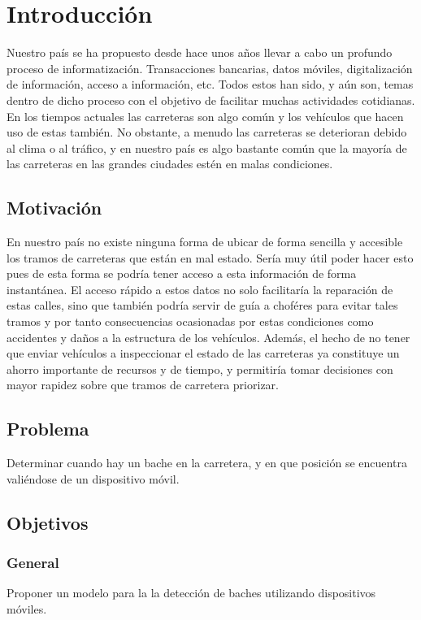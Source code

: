 \chapter*{Introducción}\label{chapter:introduction}

Nuestro país se ha propuesto desde hace unos años llevar a cabo un profundo proceso de informatización.
Transacciones bancarias, datos móviles, digitalización de información, acceso a información, etc. Todos
estos han sido, y aún son, temas dentro de dicho proceso con el objetivo de facilitar muchas actividades
cotidianas. En los tiempos actuales las carreteras son algo común y los vehículos que hacen uso de estas
también. No obstante, a menudo las carreteras se deterioran debido al clima o al tráfico, y en nuestro
país es algo bastante común que la mayoría de las carreteras en las grandes ciudades estén en malas condiciones.

\section*{Motivación}
En nuestro país no existe ninguna forma de ubicar de forma sencilla y accesible los tramos de carreteras que están
en mal estado. Sería muy útil poder hacer esto pues de esta forma se podría tener acceso a esta información de forma
instantánea. El acceso rápido a estos datos no solo facilitaría la reparación de estas calles, sino que también podría
servir de guía a choféres para evitar tales tramos y por tanto consecuencias ocasionadas por estas condiciones como 
accidentes y daños a la estructura de los vehículos. Además, el hecho de no tener que enviar vehículos a inspeccionar
el estado de las carreteras ya constituye un ahorro importante de recursos y de tiempo, y permitiría tomar decisiones 
con mayor rapidez sobre que tramos de carretera priorizar.

\section*{Problema}
Determinar cuando hay un bache en la carretera, y en que posición se encuentra valiéndose de un dispositivo móvil.


\section*{Objetivos}
\subsection*{General}
Proponer un modelo para la la detección de baches utilizando dispositivos móviles.

